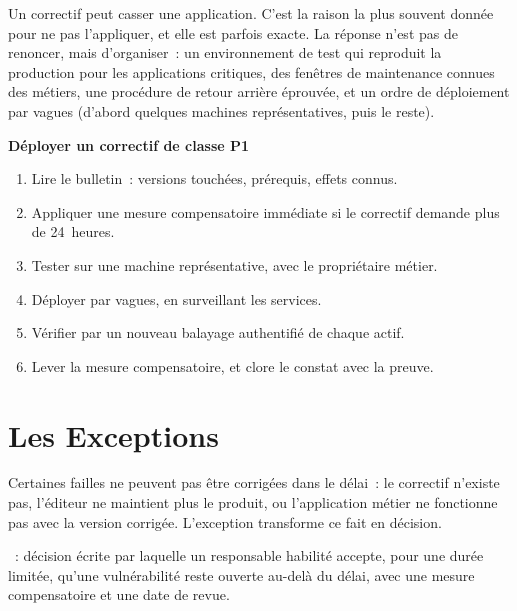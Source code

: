 Un correctif peut casser une application. C'est la raison la plus souvent
donnée pour ne pas l'appliquer, et elle est parfois exacte. La réponse n'est
pas de renoncer, mais d'organiser~: un environnement de test qui reproduit
la production pour les applications critiques, des fenêtres de maintenance
connues des métiers, une procédure de retour arrière éprouvée, et un ordre
de déploiement par vagues (d'abord quelques machines représentatives, puis
le reste).

\begin{boxinfo}
\textbf{Déployer un correctif de classe P1}
\begin{enumerate}
    \item Lire le bulletin~: versions touchées, prérequis, effets connus.
    \item Appliquer une mesure compensatoire immédiate si le correctif
          demande plus de 24~heures.
    \item Tester sur une machine représentative, avec le propriétaire
          métier.
    \item Déployer par vagues, en surveillant les services.
    \item Vérifier par un nouveau balayage authentifié de chaque actif.
    \item Lever la mesure compensatoire, et clore le constat avec la
          preuve.
\end{enumerate}
\end{boxinfo}

\section{Les Exceptions}
\label{sec:c11-exceptions}

Certaines failles ne peuvent pas être corrigées dans le délai~: le
correctif n'existe pas, l'éditeur ne maintient plus le produit, ou
l'application métier ne fonctionne pas avec la version corrigée. L'exception
transforme ce fait en décision.

\begin{boxdef}
\textbf{}~: décision écrite par laquelle un responsable
habilité accepte, pour une durée limitée, qu'une vulnérabilité reste
ouverte au-delà du délai, avec une mesure compensatoire et une date de
revue.
\end{boxdef}


